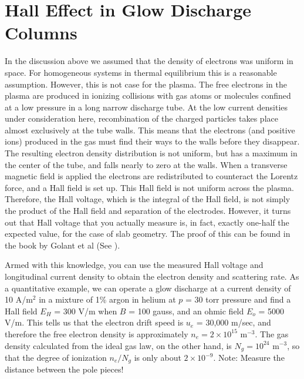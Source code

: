 \documentclass{../lab}
\begin{document}
\section{Hall Effect in Glow Discharge Columns}

In the discussion above we assumed that the density of electrons was uniform in space. For homogeneous systems in thermal equilibrium this is a reasonable assumption. However, this is not case for the plasma. The free electrons in the plasma are produced in ionizing collisions with gas atoms or molecules confined at a low pressure in a long narrow discharge tube. At the low current densities under consideration here, recombination of the charged particles takes place almost exclusively at the tube walls. This means that the electrons (and positive ions) produced in the gas must find their ways to the walls before they disappear. The resulting electron density distribution is not uniform, but has a maximum in the center of the tube, and falls nearly to zero at the walls. When a transverse magnetic field is applied the electrons are redistributed to counteract the Lorentz force, and a Hall field is set up. This Hall field is not uniform across the plasma. Therefore, the Hall voltage, which is the integral of the Hall field, is not simply the product of the Hall field and separation of the electrodes. However, it turns out that Hall voltage that you actually measure is, in fact, exactly one-half the expected value, for the case of slab geometry. The proof of this can be found in the book by Golant et al (See ).

Armed with this knowledge, you can use the measured Hall voltage and longitudinal current density to obtain the electron density and scattering rate. As a quantitative example, we can operate a glow discharge at a current density of 10 A/m$^2$ in a mixture of 1\% argon in helium at $p$ = 30 torr pressure and find a Hall field $E_H$ = 300 V/m when $B$ = 100 gauss, and an ohmic field $E_o$ = 5000 V/m. This tells us that the electron drift speed is $u_e$ = 30,000 m/sec, and therefore the free electron density is approximately $n_e = 2 \times 10^{15}$ m$^{-3}$. The gas density calculated from the ideal gas law, on the other hand, is $N_g = 10^{24}$ m$^{-3}$, so that the degree of ionization $n_e/N_g$ is only about $2 \times 10^{-9}$. Note: Measure the distance between the pole pieces!
\end{document}
